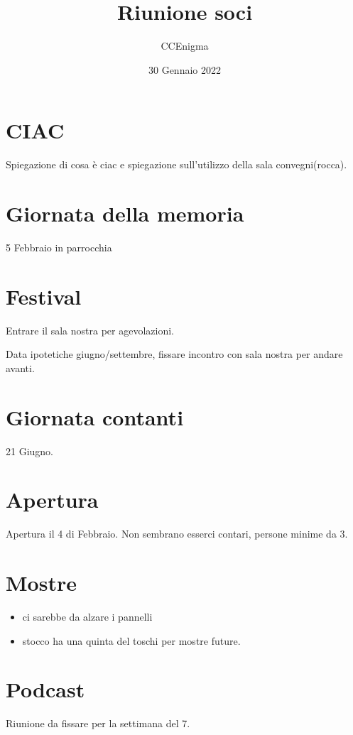 \documentclass{article}
\begin{document}
    \author{CCEnigma}
    \title{Riunione soci}
    \date{30 Gennaio 2022}

    \maketitle
    \tableofcontents

    \listoffigures
    \listoftables



    \section{CIAC}
    Spiegazione di cosa è ciac e spiegazione sull'utilizzo della sala convegni(rocca).

    \section{Giornata della memoria}
    5 Febbraio in parrocchia

    \section{Festival}
    Entrare il sala nostra per agevolazioni.

    Data ipotetiche giugno/settembre, fissare incontro con sala nostra per andare avanti.

    \section{Giornata contanti}
    21 Giugno.


    \section{Apertura}
    Apertura il 4 di Febbraio.
    Non sembrano esserci contari, persone minime da 3.


    \section{Mostre}
    \begin{itemize}
        \item ci sarebbe da alzare i pannelli
        \item stocco ha una quinta del toschi per mostre future.
    \end{itemize}


    \section{Podcast}
    Riunione da fissare per la settimana del 7.
\end{document}
